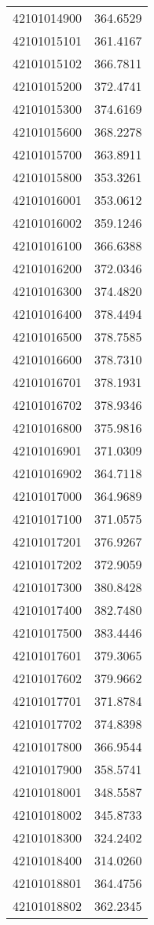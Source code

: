 \begin{longtable}[t]{lr}
42101014900 & 364.6529\\
42101015101 & 361.4167\\
42101015102 & 366.7811\\
42101015200 & 372.4741\\
42101015300 & 374.6169\\
42101015600 & 368.2278\\
42101015700 & 363.8911\\
42101015800 & 353.3261\\
42101016001 & 353.0612\\
42101016002 & 359.1246\\
42101016100 & 366.6388\\
42101016200 & 372.0346\\
42101016300 & 374.4820\\
42101016400 & 378.4494\\
42101016500 & 378.7585\\
42101016600 & 378.7310\\
42101016701 & 378.1931\\
42101016702 & 378.9346\\
42101016800 & 375.9816\\
42101016901 & 371.0309\\
42101016902 & 364.7118\\
42101017000 & 364.9689\\
42101017100 & 371.0575\\
42101017201 & 376.9267\\
42101017202 & 372.9059\\
42101017300 & 380.8428\\
42101017400 & 382.7480\\
42101017500 & 383.4446\\
42101017601 & 379.3065\\
42101017602 & 379.9662\\
42101017701 & 371.8784\\
42101017702 & 374.8398\\
42101017800 & 366.9544\\
42101017900 & 358.5741\\
42101018001 & 348.5587\\
42101018002 & 345.8733\\
42101018300 & 324.2402\\
42101018400 & 314.0260\\
42101018801 & 364.4756\\
42101018802 & 362.2345\\

\end{longtable}
